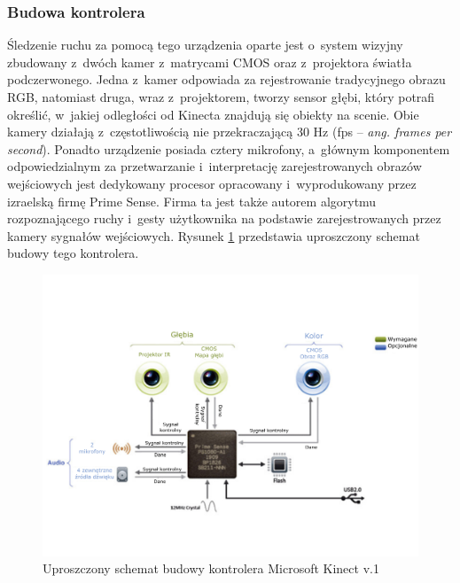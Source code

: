 \subsubsection*{Budowa kontrolera}
Śledzenie ruchu za pomocą tego urządzenia oparte jest o~system wizyjny zbudowany z~dwóch kamer z~matrycami CMOS oraz z~projektora światła podczerwonego. Jedna z~kamer odpowiada za rejestrowanie tradycyjnego obrazu RGB, natomiast druga, wraz z~projektorem, tworzy sensor głębi, który potrafi określić, w~jakiej odległości od Kinecta znajdują się obiekty na scenie. Obie kamery działają z~częstotliwością nie przekraczającą 30 Hz (fps -- \emph{ang. frames per second}). Ponadto urządzenie posiada cztery mikrofony, a~głównym komponentem odpowiedzialnym za przetwarzanie i~interpretację zarejestrowanych obrazów wejściowych jest dedykowany procesor opracowany i~wyprodukowany przez izraelską firmę Prime Sense. Firma ta jest także autorem algorytmu rozpoznającego ruchy i~gesty użytkownika na podstawie zarejestrowanych przez kamery sygnałów wejściowych. Rysunek \ref{fig:characteristics:kinect:inside} przedstawia uproszczony schemat budowy tego kontrolera. 
																													
\begin{savenotes}
	\begin{figure}
		\centering
		\includegraphics[width=\textwidth]{images/kinectSchema.png}
		\caption[Uproszczony schemat budowy kontrolera Microsoft Kinect v.1]{Uproszczony schemat budowy kontrolera Microsoft Kinect v.1}
		\label{fig:characteristics:kinect:inside} 
	\end{figure}
\end{savenotes}
																															
